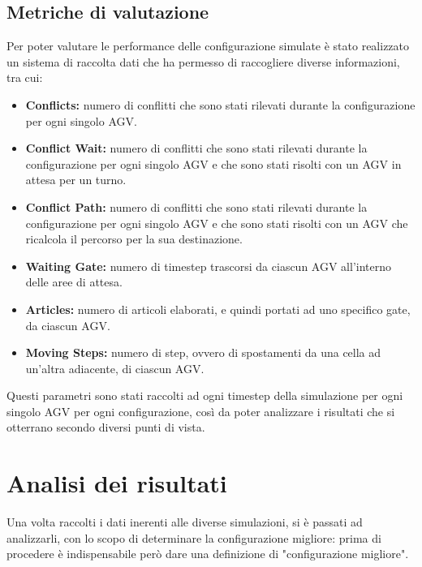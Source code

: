 \documentclass[12pt]{article}
\begin{document}
\newpage

\subsection{Metriche di valutazione}
Per poter valutare le performance delle configurazione simulate è stato realizzato un sistema di raccolta dati che ha permesso di raccogliere diverse informazioni, tra cui:

\begin{itemize}
    \item \textbf{Conflicts:} numero di conflitti che sono stati rilevati durante la configurazione per ogni singolo AGV.
    \item \textbf{Conflict Wait:} numero di conflitti che sono stati rilevati durante la configurazione per ogni singolo AGV e che sono stati risolti con un AGV in attesa per un turno.
    \item \textbf{Conflict Path:} numero di conflitti che sono stati rilevati durante la configurazione per ogni singolo AGV e che sono stati risolti con un AGV che ricalcola il percorso per la sua destinazione.
    \item \textbf{Waiting Gate:} numero di timestep trascorsi da ciascun AGV all'interno delle aree di attesa.
    \item \textbf{Articles:}  numero di articoli elaborati, e quindi portati ad uno specifico gate, da ciascun AGV.
    \item \textbf{Moving Steps:} numero di step, ovvero di spostamenti da una cella ad un'altra adiacente, di ciascun AGV.
\end{itemize}

\noindent Questi parametri sono stati raccolti ad ogni timestep della simulazione per ogni singolo AGV per ogni configurazione, così da poter analizzare i risultati che si otterrano secondo diversi punti di vista.


\newpage
\section{Analisi dei risultati}
Una volta raccolti i dati inerenti alle diverse simulazioni, si è passati ad analizzarli, con lo scopo di determinare la configurazione migliore: prima di procedere è indispensabile però dare una definizione di "configurazione migliore". \\
\end{document}
